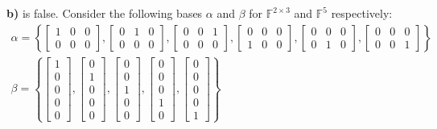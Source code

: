 \documentclass{article}
\begin{document}
\textbf{b)} is false. Consider the following bases $\alpha$ and $\beta$ for $\mathbb F^{2\times 3}$ and $\mathbb F^5$ respectively:
\begin{gather*}
  \alpha=\left\{\begin{bmatrix}
    1&0&0\\0&0&0
  \end{bmatrix},\begin{bmatrix}
    0&1&0\\0&0&0
  \end{bmatrix},\begin{bmatrix}
    0&0&1\\0&0&0
  \end{bmatrix},\begin{bmatrix}
    0&0&0\\1&0&0
  \end{bmatrix},\begin{bmatrix}
    0&0&0\\0&1&0
  \end{bmatrix},\begin{bmatrix}
    0&0&0\\0&0&1
  \end{bmatrix}\right\}\\
  \beta=\left\{\begin{bmatrix}
    1\\0\\0\\0\\0
  \end{bmatrix},\begin{bmatrix}
    0\\1\\0\\0\\0
  \end{bmatrix},\begin{bmatrix}
    0\\0\\1\\0\\0
  \end{bmatrix},\begin{bmatrix}
    0\\0\\0\\1\\0
  \end{bmatrix},\begin{bmatrix}
    0\\0\\0\\0\\1
  \end{bmatrix}\right\}
\end{gather*}
\end{document}

